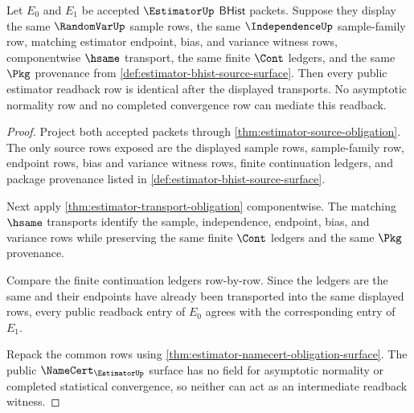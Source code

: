 \begin{theorem}
\label{thm:estimator-finite-cont-readback-determinacy}
Let $E_0$ and $E_1$ be accepted $\EstimatorUp$ $\mathsf{BHist}$ packets. Suppose
they display the same $\RandomVarUp$ sample rows, the same $\IndependenceUp$
sample-family row, matching estimator endpoint, bias, and variance witness
rows, componentwise $\hsame$ transport, the same finite $\Cont$ ledgers, and
the same $\Pkg$ provenance from
\autoref{def:estimator-bhist-source-surface}. Then every public estimator
readback row is identical after the displayed transports. No asymptotic
normality row and no completed convergence row can mediate this readback.
\end{theorem}
\begin{proof}
Project both accepted packets through
\autoref{thm:estimator-source-obligation}. The only source rows exposed are the
displayed sample rows, sample-family row, endpoint rows, bias and variance
witness rows, finite continuation ledgers, and package provenance listed in
\autoref{def:estimator-bhist-source-surface}.

Next apply \autoref{thm:estimator-transport-obligation} componentwise. The
matching $\hsame$ transports identify the sample, independence, endpoint, bias,
and variance rows while preserving the same finite $\Cont$ ledgers and the same
$\Pkg$ provenance.

Compare the finite continuation ledgers row-by-row. Since the ledgers are the
same and their endpoints have already been transported into the same displayed
rows, every public readback entry of $E_0$ agrees with the corresponding entry
of $E_1$.

Repack the common rows using
\autoref{thm:estimator-namecert-obligation-surface}. The public
$\NameCert_{\EstimatorUp}$ surface has no field for asymptotic normality or
completed statistical convergence, so neither can act as an intermediate
readback witness.
\end{proof}

